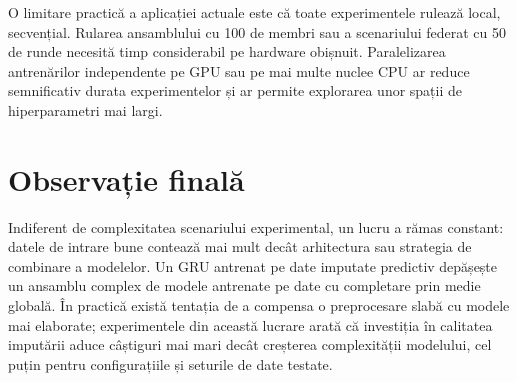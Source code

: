 O limitare practică a aplicației actuale este că toate experimentele rulează local, secvențial. Rularea ansamblului cu 100 de membri sau a scenariului federat cu 50 de runde necesită timp considerabil pe hardware obișnuit. Paralelizarea antrenărilor independente pe GPU sau pe mai multe nuclee CPU ar reduce semnificativ durata experimentelor și ar permite explorarea unor spații de hiperparametri mai largi.

\section{Observație finală}

Indiferent de complexitatea scenariului experimental, un lucru a rămas constant: datele de intrare bune contează mai mult decât arhitectura sau strategia de combinare a modelelor. Un GRU antrenat pe date imputate predictiv depășește un ansamblu complex de modele antrenate pe date cu completare prin medie globală. În practică există tentația de a compensa o preprocesare slabă cu modele mai elaborate; experimentele din această lucrare arată că investiția în calitatea imputării aduce câștiguri mai mari decât creșterea complexității modelului, cel puțin pentru configurațiile și seturile de date testate.

